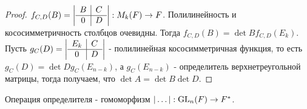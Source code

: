 \begin{proof}
	\(f_{C, D}(B) = \left|\begin{array}{c | c}
		B & C \\\hline 
		0 & D
	\end{array}\right|:M_{k}(F)\to F\). Полилинейность и кососимметричность столбцов очевидны. Тогда \(f_{C,D}(B) = \det B f_{C,D}(E_k)\). Пусть \(g_C(D) = \left|\begin{array}{c | c}
		E_k & C \\\hline 
		0 & D
	\end{array}\right|\) - полилинейная кососимметричная функция, то есть \(g_C(D) = \det D g_C(E_{n-k})\), а \(g_C(E_{n-k})\) - определитель верхнетреугольной матрицы, тогда получаем, что \(\det A = \det B\det D\).
\end{proof}
Операция определителя - гомоморфизм \(|\ldots|: \operatorname{GL}_n(F)\to F^*\). 
